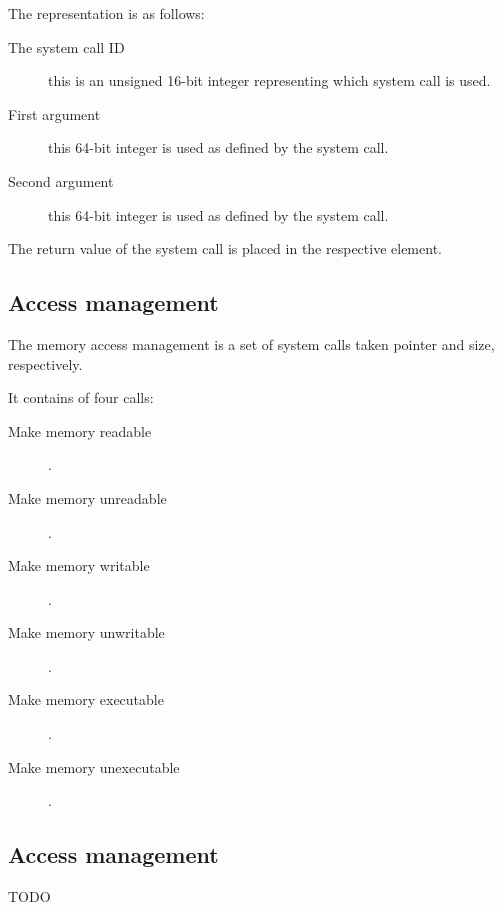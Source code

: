 \documentclass[11pt]{article}
\begin{document}
    The representation is as follows:

    \begin{description}
        \item [The system call ID] this is an unsigned 16-bit integer
            representing which system call is used.
        \item [First argument] this 64-bit integer is used as defined by the
            system call.
        \item [Second argument] this 64-bit integer is used as defined by the
            system call.
    \end{description}

    The return value of the system call is placed in the respective element.

    \subsection{Access management}
    The memory access management is a set of system calls taken pointer and
    size, respectively.

    It contains of four calls:

    \begin{description}
        \item [Make memory readable].
        \item [Make memory unreadable].
        \item [Make memory writable].
        \item [Make memory unwritable].
        \item [Make memory executable].
        \item [Make memory unexecutable].
    \end{description}

    \subsection{Access management}


    \begin{thebibliography}{9}
        TODO
    \end{thebibliography}
\end{document}
